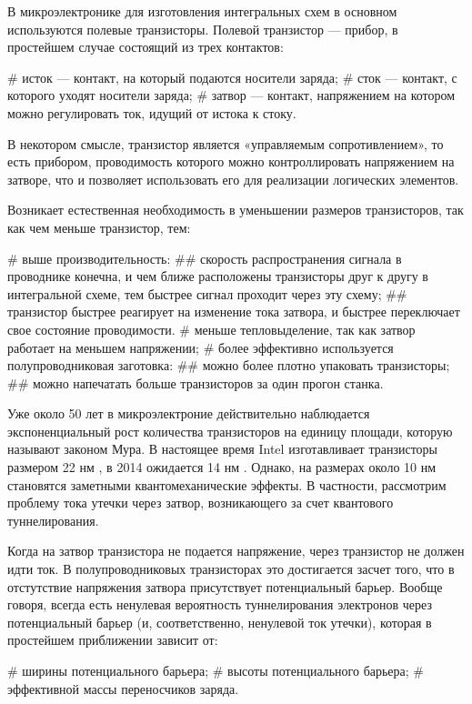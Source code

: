 \startprefacepage

В микроэлектронике для изготовления интегральных схем в основном используются полевые транзисторы. Полевой транзистор — прибор, в простейшем случае состоящий из трех контактов:
\begin{easylist}[itemize]
# исток — контакт, на который подаются носители заряда;
# сток — контакт, с которого уходят носители заряда;
# затвор — контакт, напряжением на котором можно регулировать ток, идущий от истока к стоку.
\end{easylist}
В некотором смысле, транзистор является «управляемым сопротивлением», то есть прибором, проводимость которого можно контроллировать напряжением на затворе, что и позволяет использовать его для реализации логических элементов.

Возникает естественная необходимость в уменьшении размеров транзисторов, так как чем меньше транзистор, тем:
\begin{easylist}[itemize]
# выше производительность:
## скорость распространения сигнала в проводнике конечна, и чем ближе расположены транзисторы друг к другу в интегральной схеме, тем быстрее сигнал проходит через эту схему;
## транзистор быстрее реагирует на изменение тока затвора, и быстрее переключает свое состояние проводимости.
# меньше тепловыделение, так как затвор работает на меньшем напряжении;
# более эффективно используется полупроводниковая заготовка:
## можно более плотно упаковать транзисторы;
## можно напечатать больше транзисторов за один прогон станка.
\end{easylist}

Уже около 50 лет в микроэлектроние действительно наблюдается экспоненциальный рост количества транзисторов на единицу площади, которую называют законом Мура. В настоящее время Intel изготавливает транзисторы размером 22 нм \cite{intel_22_nm}, в 2014 ожидается 14 нм \cite{14_nm}. Однако, на размерах около 10 нм становятся заметными квантомеханические эффекты. В частности, рассмотрим проблему тока утечки через затвор, возникающего за счет квантового туннелирования.

Когда на затвор транзистора не подается напряжение, через транзистор не должен идти ток. В полупроводниковых транзисторах это достигается засчет того, что в отстутствие напряжения затвора присутствует потенциальный барьер. Вообще говоря, всегда есть ненулевая вероятность туннелирования электронов через потенциальный барьер (и, соответственно, ненулевой ток утечки), которая в простейшем приближении зависит от:
\begin{easylist}[itemize]
# ширины потенциального барьера;
# высоты потенциального барьера;
# эффективной массы переносчиков заряда. %
\end{easylist}

